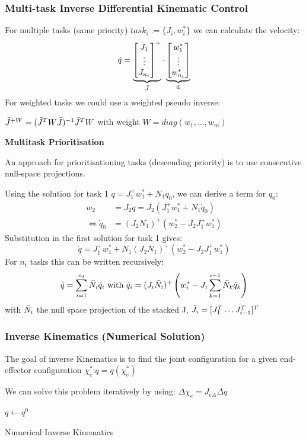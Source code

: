 \documentclass[fontsize=6pt,DIV=calc,a4paper,ngerman]{scrartcl}
\begin{document}
\begin{multicols*}{4}
	\subsubsection{Multi-task Inverse Differential Kinematic Control}
	For multiple tasks (same priority) $task_i := \{ J_i, w_i^*\}$ we can calculate the velocity:
	$$\dot{q} = \underbrace{\begin{bmatrix} J_1 \\ \vdots \\ J_{n_t}\end{bmatrix}^+}_{\Bar{J}} \cdot\underbrace{\begin{bmatrix} w_1^* \\ \vdots \\ w_{n_t}^*\end{bmatrix}}_{\Bar{w}}$$
	For weighted tasks we could use a weighted pseudo inverse:

	$\Bar{J}^{+W} = (\Bar{J}^T W\Bar{J})^{-1}\Bar{J}^TW$ with weight $W=diag(w_1, ... , w_m)$

	\medskip
	\textbf{Multitask Prioritisation}

	An approach for prioritisationing tasks (descending priority) is to use consecutive null-space projections.

	\smallskip
	Using the solution for task 1 $\dot{q} = J_1^+w_1^*+N_1\dot{q}_0$, we can derive a term for $q_0$:
	\begin{align*}
		w_2                           & =J_2\dot{q}= J_2(J_1^+w_1^*+N_1\dot{q}_0) \\
		\Longleftrightarrow \dot{q}_0 & = (J_2N_1)^+(w_2^*-J_2J_1^+w_1^*)
	\end{align*}
	Substitution in the first solution for task 1 gives:
	$$\dot{q} = J_1^+w_1^*+N_1(J_2N_1)^+(w_2^*-J_2J_1^+w_1^*)$$
	For $n_t$ tasks this can be written recursively:
	$$\dot{q}= \sum_{i=1}^{n_t}\Bar{N}_i\dot{q}_i \text{ with } \dot{q}_i = (J_i\Bar{N}_i)^+\left( w_i^* - J_i \sum_{k=1}^{i-1}\Bar{N}_k\dot{q}_k\right)$$
	with $\Bar{N}_i$ the null space projection of the stacked J, $\Bar{J}_i = [J_1^T \dots J_{i-1}^T ]^T$

	\subsubsection{Inverse Kinematics (Numerical Solution)}
	The goal of inverse Kinematics is to find the joint configuration for a given end-effector configuration $\chi_e^*$:\quad $q=q(\chi_e^*)$

	\smallskip
	We can solve this problem iteratively by using: $\Delta\chi_e = J_{eA}\Delta q$
	\begin{algorithm}[H]
		\small
		\SetAlgoLined
		$q \leftarrow q^0$ 
		\caption{Numerical Inverse Kinematics}
	\end{algorithm}


\end{multicols*}
\end{document}
